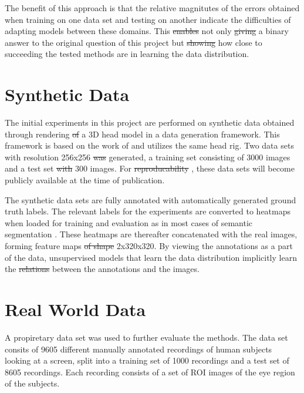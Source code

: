 The benefit of this approach is that the relative magnitutes of the errors obtained when training on one data set and testing on another indicate the difficulties of adapting models between these domains. This \st{enables}  not only \st{giving}  a binary answer to the original question of this project but \st{showing}  how close to succeeding the tested methods are in learning the data distribution. 


\section{Synthetic Data}
The initial experiments in this project are performed on synthetic data obtained through rendering \st{of} a 3D head model in a data generation framework. This framework is based on the work of \textcite{swirski2014rendering} and utilizes the same head rig. Two data sets with resolution 256x256 \st{was}  generated, a training set consisting of 3000 images and a test set \st{with}  300 images. For \st{reproducability} , these data sets will become publicly available at the time of publication.

The synthetic data sets are fully annotated with automatically generated ground truth labels. The relevant labels for the experiments are converted to heatmaps when loaded for training and evaluation as in most cases of semantic segmentation \parencite{guo2017review}. These heatmaps are thereafter concatenated with the real images, forming feature maps \st{of shape}  2x320x320. By viewing the annotations as a part of the data, unsupervised models that learn the data distribution implicitly learn the \st{relations}  between the annotations and the images.

\section{Real World Data}
A propiretary data set was used to further evaluate the methods. The data set consits of 9605 different manually annotated recordings of human subjects looking at a screen, split into a training set of 1000 recordings and a test set of 8605 recordings. Each recording consists of a set of ROI  images of the eye region of the subjects. 

